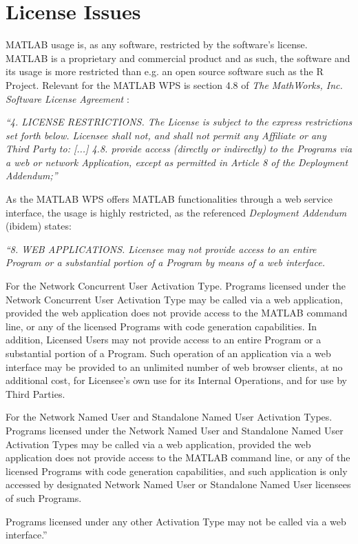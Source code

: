 \section{License Issues}
  MATLAB usage is, as any software, restricted by the software's license. MATLAB is a proprietary and commercial product and as such, the software and its usage is more restricted than e.g. an open source software such as the R Project. Relevant for the MATLAB WPS is section 4.8 of \emph{The MathWorks, Inc. Software License Agreement} \citep{matlablicense}:
  \begin{xquote}\itshape\small
    ``4. LICENSE RESTRICTIONS. The License is subject to the express restrictions
    set forth below. Licensee shall not, and shall not permit any Affiliate or any
    Third Party to:
      [...]
      4.8. provide access (directly or indirectly) to the Programs via a web or
      network Application, except as permitted in Article 8 of the Deployment
      Addendum;''
  \end{xquote}

  As the MATLAB WPS offers MATLAB functionalities through a web service interface, the usage is highly restricted, as the referenced \emph{Deployment Addendum} (ibidem) states:

  \begin{xquote}\itshape\small
    ``8. WEB APPLICATIONS. Licensee may not provide access to an entire Program or a substantial portion of a Program by means of a web interface.

    For the Network Concurrent User Activation Type. Programs licensed under the Network Concurrent User Activation Type may be called via a web application, provided the web application does not provide access to the MATLAB command line, or any of the licensed Programs with code generation capabilities. In addition, Licensed Users may not provide access to an entire Program or a substantial portion of a Program. Such operation of an application via a web interface may be provided to an unlimited number of web browser clients, at no additional cost, for Licensee's own use for its Internal Operations, and for use by Third Parties.

    For the Network Named User and Standalone Named User Activation Types. Programs licensed under the Network Named User and Standalone Named User Activation Types may be called via a web application, provided the web application does not provide access to the MATLAB command line, or any of the licensed Programs with code generation capabilities, and such application is only accessed by designated Network Named User or Standalone Named User licensees of such Programs.

    Programs licensed under any other Activation Type may not be called via a web interface.''
  \end{xquote}

